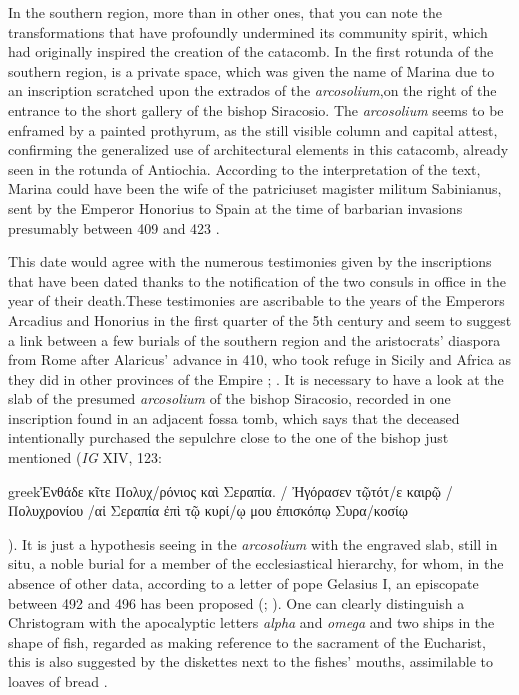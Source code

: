 \documentclass[amsthm,ebook]{saparticle}
\begin{document}
In the southern region, more than in other ones, that you can note the transformations that have profoundly undermined its community spirit, which had originally inspired the creation of the catacomb. In the first rotunda of the southern region, is a private space, which was given the name of Marina due to an inscription scratched upon the extrados of the \emph{arcosolium},on the right of the entrance to the short gallery of the bishop Siracosio. The \emph{arcosolium} seems to be enframed by a painted prothyrum, as the still visible column and capital attest, confirming the generalized use of architectural elements in this catacomb, already seen in the rotunda of Antiochia. According to the interpretation of the text, Marina could have been the wife of the patriciuset magister militum Sabinianus, sent by the Emperor Honorius to Spain at the time of barbarian invasions presumably between 409 and 423 \citep[21-22, 40]{FERRUA1989}.

This date would agree with the numerous testimonies given by the inscriptions that have been dated thanks to the notification of the two consuls in office in the year of their death.These testimonies are ascribable to the years of the Emperors Arcadius and Honorius in the first quarter of the 5th century and seem to suggest a link between a few burials of the southern region and the aristocrats’ diaspora from Rome after Alaricus’ advance in 410, who took refuge in Sicily and Africa as they did in other provinces of the Empire \citep[175]{SIRAGO1989}; %
. It is necessary to have a look at the slab of the presumed \emph{arcosolium} of the bishop Siracosio, recorded in one inscription found in an adjacent fossa tomb, which says that the deceased intentionally purchased the sepulchre close to the one of the bishop just mentioned (\emph{IG} XIV, 123: \begin{otherlanguage*}{greek}Ἐνθάδε κῖτε Πολυχ/ρόνιος καὶ Σεραπία. / Ἠγόρασεν τῷτότ/ε καιρῷ / Πολυχρονίου /αἱ Σεραπία ἐπὶ τῷ κυρί/ῳ μου ἐπισκόπῳ Συρα/κοσίῳ\end{otherlanguage*}). It is just a hypothesis seeing in the \emph{arcosolium} with the engraved slab, still in situ, a noble burial for a member of the ecclesiastical hierarchy, for whom, in the absence of other data, according to a letter of pope Gelasius I, an episcopate between 492 and 496 has been proposed (\citealp[223]{NARCISO1952}; \citealp{Carletti:2008aa}). One can clearly distinguish a Christogram with the apocalyptic letters \emph{alpha} and \emph{omega} and two ships in the shape of fish, regarded as making reference to the sacrament of the Eucharist, this is also suggested by the diskettes next to the fishes’ mouths, assimilable to loaves of bread \citep{Sgarlata2013}.
\end{document}
